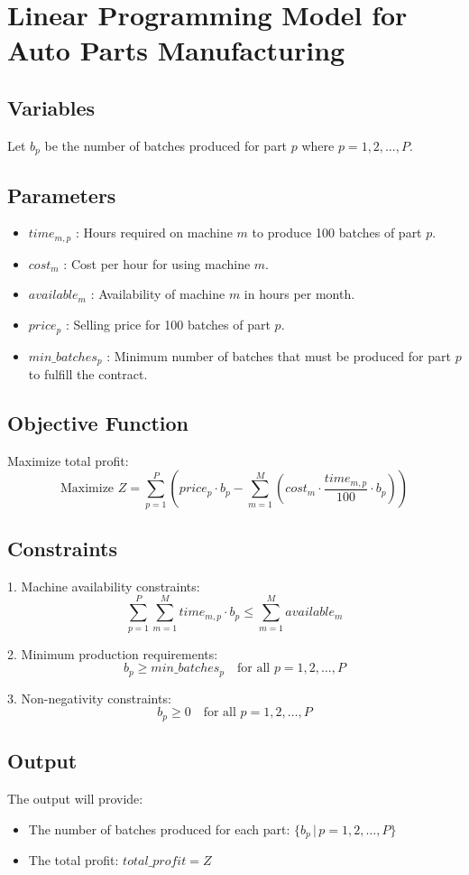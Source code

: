 \documentclass{article}
\begin{document}
\section*{Linear Programming Model for Auto Parts Manufacturing}

\subsection*{Variables}
Let \( b_p \) be the number of batches produced for part \( p \) where \( p = 1, 2, \ldots, P \).

\subsection*{Parameters}
\begin{itemize}
    \item \( time_{m,p} \) : Hours required on machine \( m \) to produce 100 batches of part \( p \).
    \item \( cost_m \) : Cost per hour for using machine \( m \).
    \item \( available_m \) : Availability of machine \( m \) in hours per month.
    \item \( price_p \) : Selling price for 100 batches of part \( p \).
    \item \( min\_batches_p \) : Minimum number of batches that must be produced for part \( p \) to fulfill the contract.
\end{itemize}

\subsection*{Objective Function}
Maximize total profit:
\[
\text{Maximize } Z = \sum_{p=1}^{P} \left( price_p \cdot b_p - \sum_{m=1}^{M} (cost_m \cdot \frac{time_{m,p}}{100} \cdot b_p) \right)
\]

\subsection*{Constraints}
1. Machine availability constraints:
\[
\sum_{p=1}^{P} \sum_{m=1}^{M} time_{m,p} \cdot b_p \leq \sum_{m=1}^{M} available_m
\]

2. Minimum production requirements:
\[
b_p \geq min\_batches_p \quad \text{for all } p = 1, 2, \ldots, P
\]

3. Non-negativity constraints:
\[
b_p \geq 0 \quad \text{for all } p = 1, 2, \ldots, P
\]

\subsection*{Output}
The output will provide:
\begin{itemize}
    \item The number of batches produced for each part: \( \{ b_p \, | \, p = 1, 2, \ldots, P \} \)
    \item The total profit: \( total\_profit = Z \)
\end{itemize}
\end{document}
